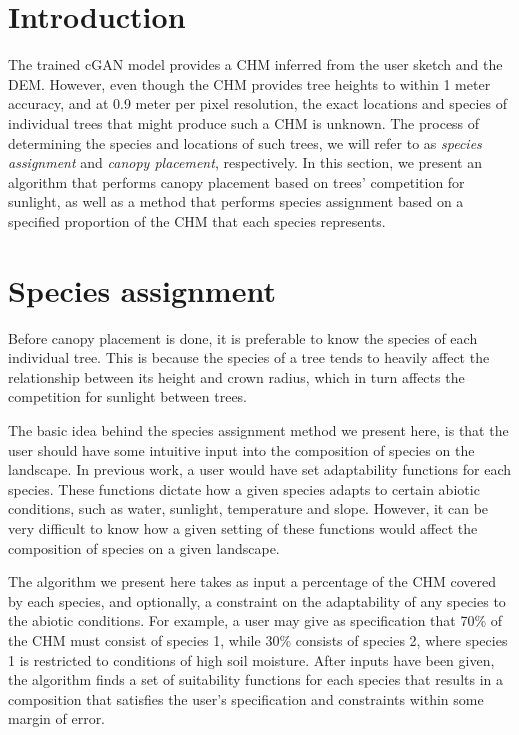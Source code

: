 \documentclass[12pt]{report}
\begin{document}
\section*{Introduction}

The trained cGAN model provides a CHM inferred from the user sketch and the DEM. However, even though the CHM provides tree heights to within 1 meter accuracy, and at 0.9 meter per pixel resolution, the exact locations and species of individual trees that might produce such a CHM is unknown. The process of determining the species and locations of such trees, we will refer to as \textit{species assignment} and \textit{canopy placement}, respectively. In this section, we present an algorithm that performs canopy placement based on trees' competition for sunlight, as well as a method that performs species assignment based on a specified proportion of the CHM that each species represents.

\section*{Species assignment}

Before canopy placement is done, it is preferable to know the species of each individual tree. This is because the species of a tree tends to heavily affect the relationship between its height and crown radius, which in turn affects the competition for sunlight between trees.

The basic idea behind the species assignment method we present here, is that the user should have some intuitive input into the composition of species on the landscape. In previous work, a user would have set adaptability functions for each species. These functions dictate how a given species adapts to certain abiotic conditions, such as water, sunlight, temperature and slope. However, it can be very difficult to know how a given setting of these functions would affect the composition of species on a given landscape. 

The algorithm we present here takes as input a percentage of the CHM covered by each species, and optionally, a constraint on the adaptability of any species to the abiotic conditions. For example, a user may give as specification that 70\% of the CHM must consist of species 1, while 30\% consists of species 2, where species 1 is restricted to conditions of high soil moisture. After inputs have been given, the algorithm finds a set of suitability functions for each species that results in a composition that satisfies the user's specification and constraints within some margin of error.
\end{document}
